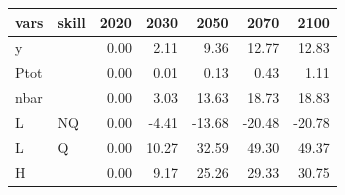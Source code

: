 \begin{tabular}{llrrrrr}
  \hline
vars & skill & 2020 & 2030 & 2050 & 2070 & 2100 \\ 
  \hline
y &  & 0.00 & 2.11 & 9.36 & 12.77 & 12.83 \\ 
  Ptot &  & 0.00 & 0.01 & 0.13 & 0.43 & 1.11 \\ 
  nbar &  & 0.00 & 3.03 & 13.63 & 18.73 & 18.83 \\ 
  L & NQ & 0.00 & -4.41 & -13.68 & -20.48 & -20.78 \\ 
  L & Q & 0.00 & 10.27 & 32.59 & 49.30 & 49.37 \\ 
  H &  & 0.00 & 9.17 & 25.26 & 29.33 & 30.75 \\ 
   \hline
\end{tabular}
